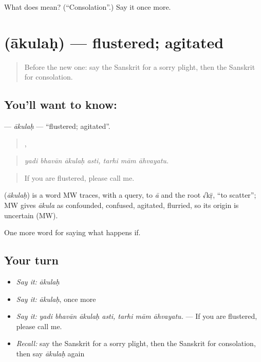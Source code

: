\begin{tcolorbox}[breakable,colback=teal!4,colframe=teal!35!black,title={Before you move on}]
What does  mean? (\textquotedblleft{}Consolation\textquotedblright{}.) Say it once more.
\end{tcolorbox}
\section[\texorpdfstring{\sk{आकुलः} (ākulaḥ)}{आकुलः (ākulaḥ)}]{ (ākulaḥ) — flustered; agitated}

\label{lesson:SA-C548-akulah}



\begin{quote}
Before the new one: say the Sanskrit for a sorry plight, then the Sanskrit for consolation.
\end{quote}

\subsection*{You'll want to know: }
\textbf{} — \emph{ākulaḥ} — \textquotedblleft{}flustered; agitated\textquotedblright{}.

\begin{quote}
   ,   
\end{quote}

\begin{quote}
\emph{yadi bhavān ākulaḥ asti, tarhi mām āhvayatu.}
\end{quote}

\begin{quote}
If you are flustered, please call me.
\end{quote}

\begin{cousinweb}
\textbf{} (\emph{ākulaḥ}) is a word MW traces, with a query, to \emph{ā} and the root √kṝ, \textquotedblleft{}to scatter\textquotedblright{}; MW gives \emph{ākula} as confounded, confused, agitated, flurried, so its origin is uncertain (MW).
\end{cousinweb}

\begin{grammarlens}[title={What you've built}]
One more word for saying what happens if.
\end{grammarlens}

\subsection*{Your turn}
\begin{itemize}
\raggedright
  \item \emph{Say it:} \emph{ākulaḥ}
  \item \emph{Say it:} \emph{ākulaḥ}, once more
  \item \emph{Say it:} \emph{yadi bhavān ākulaḥ asti, tarhi mām āhvayatu.} — If you are flustered, please call me.
  \item \emph{Recall:} say the Sanskrit for a sorry plight, then the Sanskrit for consolation, then say \emph{ākulaḥ} again
\end{itemize}

